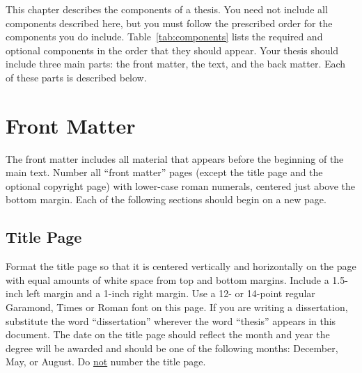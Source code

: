 \iffalse

This chapter describes the components of a thesis.  You need not include all
components described here, but you must follow the prescribed order for the
components you do include. Table~\ref{tab:components} lists the required and
optional components in the order that they should appear.  Your thesis should
include three main parts: the front matter, the text, and the back matter.
Each of these parts is described below.

\section{Front Matter}

The front matter includes all material that appears before the beginning of the
main text.  Number all ``front matter'' pages (except the title page and the
optional copyright page) with lower-case roman numerals, centered just above
the bottom margin.  Each of the following sections should begin on a new page.

\subsection{Title Page}

Format the title page so that it is centered vertically and horizontally on the
page with equal amounts of white space from top and bottom margins.  Include a
1.5-inch left margin and a 1-inch right margin.  Use a 12- or 14-point regular
Garamond, Times or Roman font on this page.  If you are writing a dissertation,
substitute the word ``dissertation'' wherever the word ``thesis'' appears in
this document.  The date on the title page should reflect the month and year
the degree will be awarded and should be one of the following months: December,
May, or August.  Do \uline{not} number the title page.

